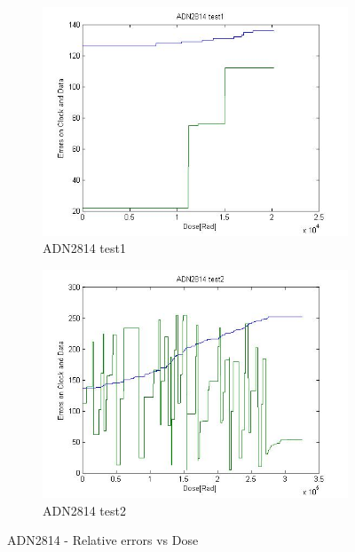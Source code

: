 \documentclass[12pt]{article}
\numberwithin{figure}{section}
\begin{document}
\begin{figure}[!htbp]
\centering
  \begin{subfigure}{.49\textwidth}
  \centering
  \includegraphics[width=\linewidth]{error_dose_ADN_t1.jpg}
  \caption{ADN2814 test1}
  \label{ADN2814_1e}
  \end{subfigure}
  \begin{subfigure}{.49\textwidth}
  \centering
  \includegraphics[width=\linewidth]{error_dose_ADN_t2.jpg}
  \caption{ADN2814 test2}
  \label{ADN2814_2e}
  \end{subfigure}
 \caption{ADN2814 - Relative errors vs Dose}
\end{figure}

\FloatBarrier
\end{document}
